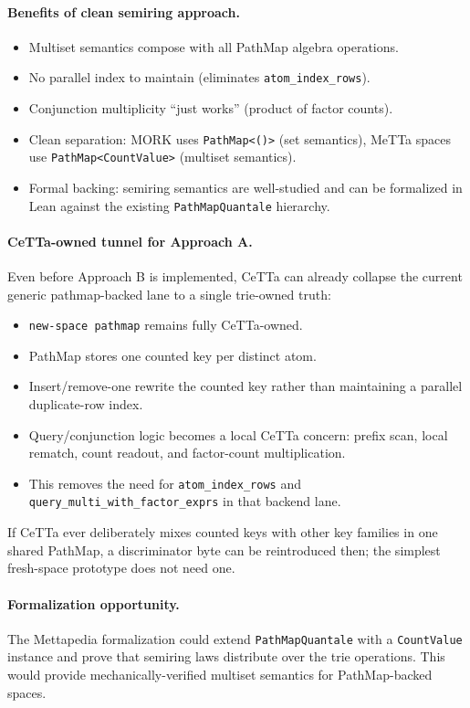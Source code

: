 \documentclass[11pt]{article}
\newcommand{\code}[1]{\texttt{#1}}
\newcommand{\PathMap}{\textup{PathMap}}
\newcommand{\MORK}{\textup{MORK}}
\newcommand{\MeTTa}{\textup{MeTTa}}
\begin{document}
\paragraph{Benefits of clean semiring approach.}
\begin{itemize}[nosep]
  \item Multiset semantics compose with all \PathMap{} algebra operations.
  \item No parallel index to maintain (eliminates \code{atom\_index\_rows}).
  \item Conjunction multiplicity ``just works'' (product of factor counts).
  \item Clean separation: \MORK{} uses \code{PathMap<()>} (set semantics),
    \MeTTa{} spaces use \code{PathMap<CountValue>} (multiset semantics).
  \item Formal backing: semiring semantics are well-studied and can be
    formalized in Lean against the existing \code{PathMapQuantale} hierarchy.
\end{itemize}

\paragraph{CeTTa-owned tunnel for Approach A.}
Even before Approach B is implemented, CeTTa can already collapse the current
generic pathmap-backed lane to a single trie-owned truth:
\begin{itemize}[nosep]
  \item \code{new-space pathmap} remains fully CeTTa-owned.
  \item PathMap stores one counted key per distinct atom.
  \item Insert/remove-one rewrite the counted key rather than maintaining a
    parallel duplicate-row index.
  \item Query/conjunction logic becomes a local CeTTa concern: prefix scan,
    local rematch, count readout, and factor-count multiplication.
  \item This removes the need for \code{atom\_index\_rows} and
    \code{query\_multi\_with\_factor\_exprs} in that backend lane.
\end{itemize}
If CeTTa ever deliberately mixes counted keys with other key families in one
shared \PathMap{}, a discriminator byte can be reintroduced then; the simplest
fresh-space prototype does not need one.

\paragraph{Formalization opportunity.}
The Mettapedia formalization could extend \code{PathMapQuantale} with a
\code{CountValue} instance and prove that semiring laws distribute over
the trie operations.  This would provide mechanically-verified multiset
semantics for \PathMap{}-backed spaces.
\end{document}
